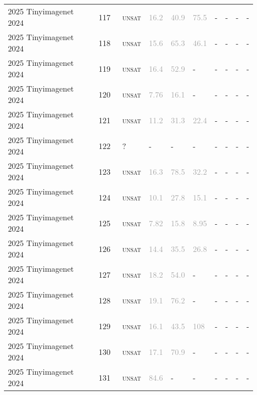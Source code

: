 \begin{center}
{\begin{longtable}{@{}llllllllll@{}}
2025 Tinyimagenet 2024 & 117 & ~\textsc{unsat} & \textcolor{darkgray}{16.2} & \textcolor{darkgray}{40.9} & \textcolor{darkgray}{75.5} & - & - & - & - \\
2025 Tinyimagenet 2024 & 118 & ~\textsc{unsat} & \textcolor{darkgray}{15.6} & \textcolor{darkgray}{65.3} & \textcolor{darkgray}{46.1} & - & - & - & - \\
2025 Tinyimagenet 2024 & 119 & ~\textsc{unsat} & \textcolor{darkgray}{16.4} & \textcolor{darkgray}{52.9} & - & - & - & - & - \\
2025 Tinyimagenet 2024 & 120 & ~\textsc{unsat} & \textcolor{darkgray}{7.76} & \textcolor{darkgray}{16.1} & - & - & - & - & - \\
2025 Tinyimagenet 2024 & 121 & ~\textsc{unsat} & \textcolor{darkgray}{11.2} & \textcolor{darkgray}{31.3} & \textcolor{darkgray}{22.4} & - & - & - & - \\
2025 Tinyimagenet 2024 & 122 & ~? & - & - & - & - & - & - & - \\
2025 Tinyimagenet 2024 & 123 & ~\textsc{unsat} & \textcolor{darkgray}{16.3} & \textcolor{darkgray}{78.5} & \textcolor{darkgray}{32.2} & - & - & - & - \\
2025 Tinyimagenet 2024 & 124 & ~\textsc{unsat} & \textcolor{darkgray}{10.1} & \textcolor{darkgray}{27.8} & \textcolor{darkgray}{15.1} & - & - & - & - \\
2025 Tinyimagenet 2024 & 125 & ~\textsc{unsat} & \textcolor{darkgray}{7.82} & \textcolor{darkgray}{15.8} & \textcolor{darkgray}{8.95} & - & - & - & - \\
2025 Tinyimagenet 2024 & 126 & ~\textsc{unsat} & \textcolor{darkgray}{14.4} & \textcolor{darkgray}{35.5} & \textcolor{darkgray}{26.8} & - & - & - & - \\
2025 Tinyimagenet 2024 & 127 & ~\textsc{unsat} & \textcolor{darkgray}{18.2} & \textcolor{darkgray}{54.0} & - & - & - & - & - \\
2025 Tinyimagenet 2024 & 128 & ~\textsc{unsat} & \textcolor{darkgray}{19.1} & \textcolor{darkgray}{76.2} & - & - & - & - & - \\
2025 Tinyimagenet 2024 & 129 & ~\textsc{unsat} & \textcolor{darkgray}{16.1} & \textcolor{darkgray}{43.5} & \textcolor{darkgray}{108} & - & - & - & - \\
2025 Tinyimagenet 2024 & 130 & ~\textsc{unsat} & \textcolor{darkgray}{17.1} & \textcolor{darkgray}{70.9} & - & - & - & - & - \\
2025 Tinyimagenet 2024 & 131 & ~\textsc{unsat} & \textcolor{darkgray}{84.6} & - & - & - & - & - & - \\

\end{longtable}}
\end{center}
